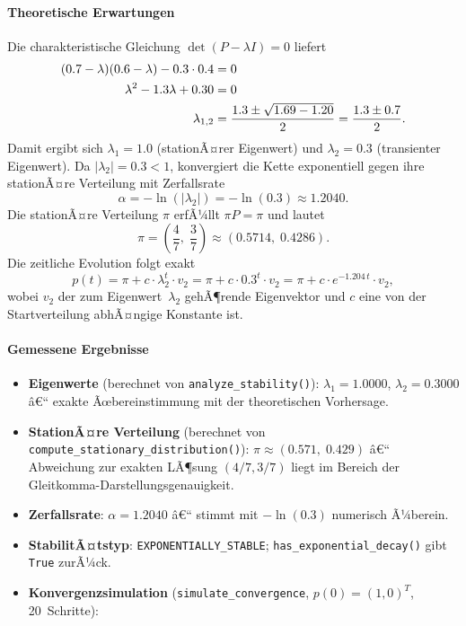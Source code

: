 ﻿\documentclass[a4paper,12pt]{scrreprt}
\theoremstyle{definition}
\begin{document}
\paragraph{Theoretische Erwartungen}

Die charakteristische Gleichung $\det(P - \lambda I) = 0$ liefert
\begin{align}
	(0.7 - \lambda)(0.6 - \lambda) - 0.3 \cdot 0.4 &= 0 \notag \\
	\lambda^2 - 1.3\lambda + 0.30 &= 0 \notag \\
	\lambda_{1,2} &= \frac{1.3 \pm \sqrt{1.69 - 1.20}}{2}
	= \frac{1.3 \pm 0.7}{2}.
\end{align}
Damit ergibt sich $\lambda_1 = 1.0$ (stationÃ¤rer Eigenwert) und
$\lambda_2 = 0.3$ (transienter Eigenwert).  Da $|\lambda_2| = 0.3 < 1$,
konvergiert die Kette exponentiell gegen ihre stationÃ¤re Verteilung mit
Zerfallsrate
\[
\alpha = -\ln(|\lambda_2|) = -\ln(0.3) \approx 1.2040.
\]
Die stationÃ¤re Verteilung $\pi$ erfÃ¼llt $\pi P = \pi$ und lautet
\[
\pi = \left(\frac{4}{7},\; \frac{3}{7}\right) \approx (0.5714,\; 0.4286).
\]
Die zeitliche Evolution folgt exakt
\begin{equation}
	p(t) = \pi + c \cdot \lambda_2^t \cdot v_2
	= \pi + c \cdot 0.3^t \cdot v_2
	= \pi + c \cdot e^{-1.204\,t} \cdot v_2,
	\label{eq:konvergenz}
\end{equation}
wobei $v_2$ der zum Eigenwert~$\lambda_2$ gehÃ¶rende Eigenvektor und
$c$ eine von der Startverteilung abhÃ¤ngige Konstante ist.

\paragraph{Gemessene Ergebnisse}

\begin{itemize}
	\item \textbf{Eigenwerte} (berechnet von \texttt{analyze\_stability()}):
	$\lambda_1 = 1.0000$, $\lambda_2 = 0.3000$ â€“ exakte
	Ãœbereinstimmung mit der theoretischen Vorhersage.
	
	\item \textbf{StationÃ¤re Verteilung} (berechnet von
	\texttt{compute\_stationary\_distribu\newline tion()}):
	$\pi \approx (0.571,\; 0.429)$ â€“ Abweichung zur exakten
	LÃ¶sung $(4/7, 3/7)$ liegt im Bereich der
	Gleitkomma-Darstellungsgenauigkeit.
	
	\item \textbf{Zerfallsrate}: $\alpha = 1.2040$ â€“ stimmt mit
	$-\ln(0.3)$ numerisch Ã¼berein.
	
	\item \textbf{StabilitÃ¤tstyp}: \texttt{EXPONENTIALLY\_STABLE};
	\texttt{has\_exponential\_decay()} gibt \texttt{True}
	zurÃ¼ck.
	
	\item \textbf{Konvergenzsimulation} (\texttt{simulate\_convergence},
	$p(0) = (1, 0)^T$, 20~Schritte):
\end{itemize}
\end{document}
